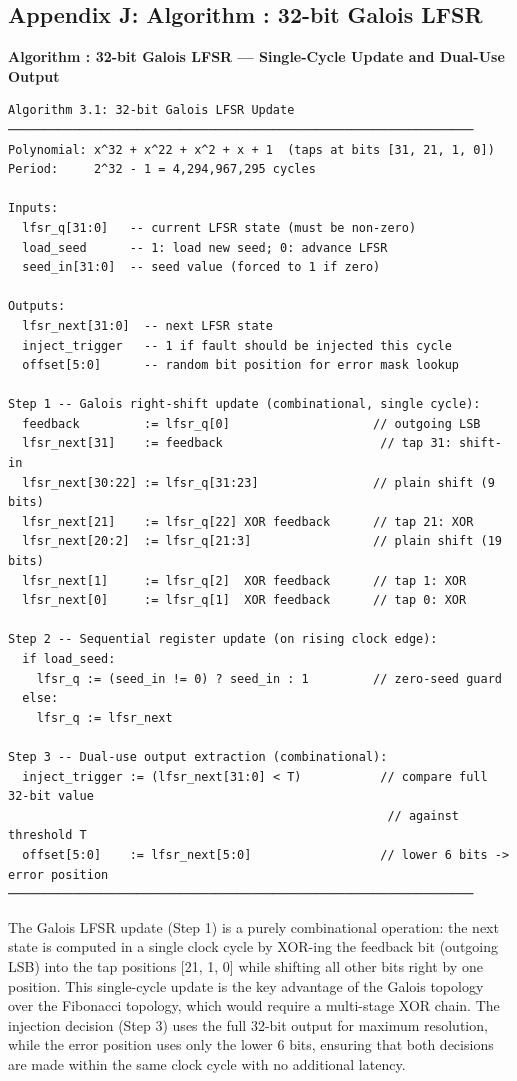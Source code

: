 \subsection{Appendix J: Algorithm : 32-bit Galois
LFSR}\label{appendix-j-algorithm-32-bit-galois-lfsr}

\textbf{Algorithm : 32-bit Galois LFSR --- Single-Cycle Update and
Dual-Use Output}

\begin{verbatim}
Algorithm 3.1: 32-bit Galois LFSR Update
─────────────────────────────────────────────────────────────────
Polynomial: x^32 + x^22 + x^2 + x + 1  (taps at bits [31, 21, 1, 0])
Period:     2^32 - 1 = 4,294,967,295 cycles

Inputs:
  lfsr_q[31:0]   -- current LFSR state (must be non-zero)
  load_seed      -- 1: load new seed; 0: advance LFSR
  seed_in[31:0]  -- seed value (forced to 1 if zero)

Outputs:
  lfsr_next[31:0]  -- next LFSR state
  inject_trigger   -- 1 if fault should be injected this cycle
  offset[5:0]      -- random bit position for error mask lookup

Step 1 -- Galois right-shift update (combinational, single cycle):
  feedback         := lfsr_q[0]                    // outgoing LSB
  lfsr_next[31]    := feedback                      // tap 31: shift-in
  lfsr_next[30:22] := lfsr_q[31:23]                // plain shift (9 bits)
  lfsr_next[21]    := lfsr_q[22] XOR feedback      // tap 21: XOR
  lfsr_next[20:2]  := lfsr_q[21:3]                 // plain shift (19 bits)
  lfsr_next[1]     := lfsr_q[2]  XOR feedback      // tap 1: XOR
  lfsr_next[0]     := lfsr_q[1]  XOR feedback      // tap 0: XOR

Step 2 -- Sequential register update (on rising clock edge):
  if load_seed:
    lfsr_q := (seed_in != 0) ? seed_in : 1         // zero-seed guard
  else:
    lfsr_q := lfsr_next

Step 3 -- Dual-use output extraction (combinational):
  inject_trigger := (lfsr_next[31:0] < T)           // compare full 32-bit value
                                                     // against threshold T
  offset[5:0]    := lfsr_next[5:0]                  // lower 6 bits -> error position
─────────────────────────────────────────────────────────────────
\end{verbatim}

The Galois LFSR update (Step 1) is a purely combinational operation: the
next state is computed in a single clock cycle by XOR-ing the feedback
bit (outgoing LSB) into the tap positions {[}21, 1, 0{]} while shifting
all other bits right by one position. This single-cycle update is the
key advantage of the Galois topology over the Fibonacci topology, which
would require a multi-stage XOR chain. The injection decision (Step 3)
uses the full 32-bit output for maximum resolution, while the error
position uses only the lower 6 bits, ensuring that both decisions are
made within the same clock cycle with no additional latency.


